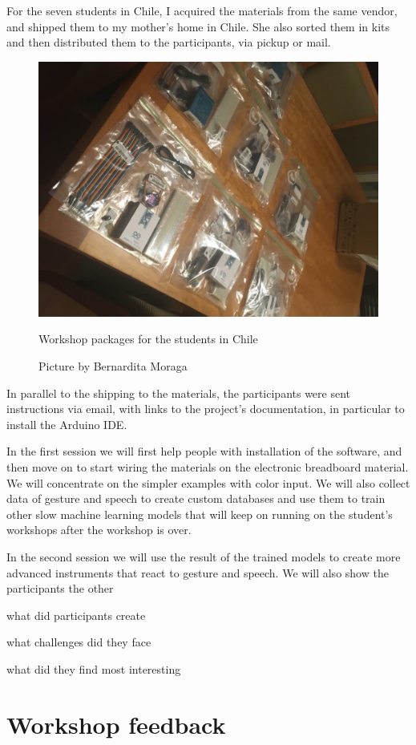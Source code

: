 For the seven students in Chile, I acquired the materials from the same vendor, and shipped them to my mother's home in Chile. She also sorted them in kits and then distributed them to the participants, via pickup or mail.

\begin{figure}[ht]
  \centering
  \includegraphics[width=0.75\linewidth,height=0.25\textheight,keepaspectratio]{images/workshop-packages-chile.jpg}
  \caption{Workshop packages for the students in Chile}
  \caption*{Picture by Bernardita Moraga}
  \label{fig:workshop-packages-chile}
\end{figure}

In parallel to the shipping to the materials, the participants were sent instructions via email, with links to the project's documentation, in particular to install the Arduino \acrshort{IDE}.

In the first session we will first help people with installation of the software, and then move on to start wiring the materials on the electronic breadboard material. We will concentrate on the simpler examples with color input. We will also collect data of gesture and speech to create custom databases and use them to train other slow machine learning models that will keep on running on the student's workshops after the workshop is over.

In the second session we will use the result of the trained models to create more advanced instruments that react to gesture and speech. We will also show the participants the other 


what did participants create

what challenges did they face

what did they find most interesting

\section{Workshop feedback}

